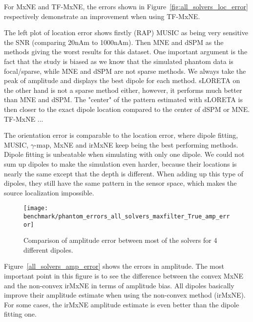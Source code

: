 For MxNE and TF-MxNE, the errors shown in Figure~\ref{fig:all_solvers_loc_error} respectively demonstrate an improvement when using TF-MxNE.

The left plot of location error shows firstly (RAP) MUSIC as being very sensitive the SNR (comparing 20nAm to 1000nAm). Then MNE and dSPM as the methods giving the worst results for this dataset. One important argument is the fact that the study is biased as we know that the simulated phantom data is focal/sparse, while MNE and dSPM are not sparse methods. We always take the peak of amplitude and displays the best dipole for each method. sLORETA on the other hand is not a sparse method either, however, it performs much better than MNE and dSPM. The "center" of the pattern estimated with sLORETA is then closer to the exact dipole location compared to the center of dSPM or MNE. TF-MxNE ...

The orientation error is comparable to the location error, where dipole fitting, MUSIC, $\gamma$-map, MxNE and irMxNE keep being the best performing methods. Dipole fitting is unbeatable when simulating with only one dipole. We could not sum up dipoles to make the simulation even harder, because their locations is nearly the same except that the depth is different. When adding up this type of dipoles, they still have the same pattern in the sensor space, which makes the source localization impossible.

\begin{figure}
	\texttt{[image: benchmark/phantom\_errors\_all\_solvers\_maxfilter\_True\_amp\_error]}
	\caption{Comparison of amplitude error between most of the solvers for 4 different dipoles.\label{fig:all_solvers_amp_error}}
\end{figure}

Figure~\ref{all_solvers_amp_error}  shows the errors in amplitude. The most important point in this figure is to see the difference between the convex MxNE and the non-convex irMxNE in terms of amplitude bias. All dipoles basically improve their amplitude estimate when using the non-convex method (irMxNE). For some cases, the irMxNE amplitude estimate is even better than the dipole fitting one.

